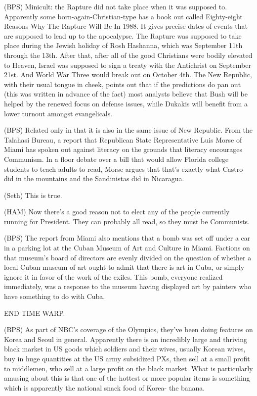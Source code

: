 \documentclass[12pt]{article}
\begin{document}
(BPS) Minicult: the Rapture did not take place when it was supposed to. Apparently some born-again-Christian-type has a book out called Eighty-eight Reasons Why The Rapture Will Be In 1988. It gives precise dates of events that are supposed to lead up to the apocalypse. The Rapture was supposed to take place during the Jewish holiday of Rosh Hashanna, which was September 11th through the 13th. After that, after all of the good Christians were bodily elevated to Heaven, Israel was supposed to sign a treaty with the Antichrist on September 21st. And World War Three would break out on October 4th. The New Republic, with their usual tongue in cheek, points out that if the predictions do pan out (this was written in advance of the fact) most analysts believe that Bush will be helped by the renewed focus on defense issues, while Dukakis will benefit from a lower turnout amongst evangelicals.

(BPS) Related only in that it is also in the same issue of New Republic. From the Talahasi Bureau, a report that Republican State Representative Luis Morse of Miami has spoken out against literacy on the grounds that literacy encourages Communism. In a floor debate over a bill that would allow Florida college students to teach adults to read, Morse argues that that's exactly what Castro did in the mountains and the Sandinistas did in Nicaragua.

(Seth) This is true.

(HAM) Now there's a good reason not to elect any of the people currently running for President. They can probably all read, so they must be Communists.

(BPS) The report from Miami also mentions that a bomb was set off under a car in a parking lot at the Cuban Museum of Art and Culture in Miami. Factions on that museum's board of directors are evenly divided on the question of whether a local Cuban museum of art ought to admit that there is art in Cuba, or simply ignore it in favor of the work of the exiles. This bomb, everyone realized immediately, was a response to the museum having displayed art by painters who have something to do with Cuba.

END TIME WARP.

(BPS) As part of NBC's coverage of the Olympics, they've been doing features on Korea and Seoul in general. Apparently there is an incredibly large and thriving black market in US goods which soldiers and their wives, usually Korean wives, buy in huge quantities at the US army subsidized PXs, then sell at a small profit to middlemen, who sell at a large profit on the black market. What is particularly amusing about this is that one of the hottest or more popular items is something which is apparently the national snack food of Korea- the banana.
\end{document}
